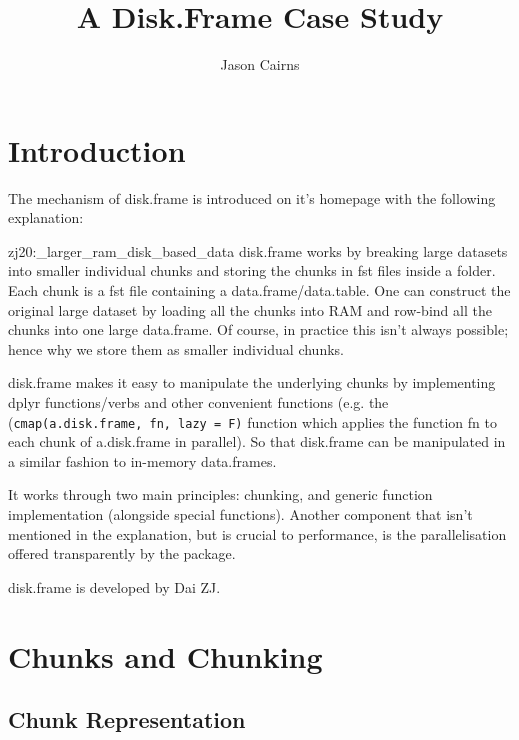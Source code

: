 \documentclass[10pt,a4paper]{article}
\begin{document}
\title{A Disk.Frame Case Study}
\author{Jason Cairns}
  
\maketitle{}

\section{Introduction}
\label{sec:introduction}

The mechanism of disk.frame is introduced on it's homepage with the
following explanation:

\begin{displaycquote}{zj20:_larger_ram_disk_based_data}
	{disk.frame} works by breaking large datasets into smaller
	individual chunks and storing the chunks in fst files inside a
	folder. Each chunk is a fst file containing a data.frame/data.table.
	One can construct the original large dataset by loading all the
	chunks into RAM and row-bind all the chunks into one large
	data.frame. Of course, in practice this isn’t always possible; hence
	why we store them as smaller individual chunks.

		{disk.frame} makes it easy to manipulate the underlying chunks by
	implementing dplyr functions/verbs and other convenient functions
	(e.g. the (\texttt{cmap(a.disk.frame, fn, lazy = F)} function which
	applies the function fn to each chunk of a.disk.frame in parallel).
	So that {disk.frame} can be manipulated in a similar fashion to
	in-memory data.frames.
\end{displaycquote}

It works through two main principles: chunking, and generic function
implementation (alongside special functions). Another component that
isn't mentioned in the explanation, but is crucial to performance, is
the parallelisation offered transparently by the package.

disk.frame is developed by Dai ZJ.

\section{Chunks and Chunking}
\label{sec:chunking}

\subsection{Chunk Representation}
\label{sec:chunk-representation}
\end{document}
